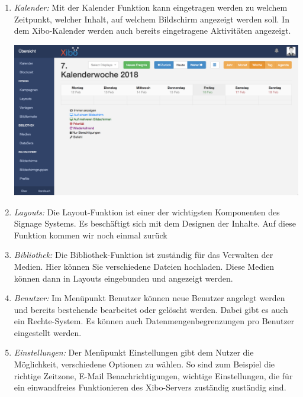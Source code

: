 \begin{enumerate}
	\item {\em Kalender:} Mit der Kalender Funktion kann eingetragen werden zu welchem Zeitpunkt, welcher Inhalt, auf welchem Bildschirm angezeigt werden soll. In dem Xibo-Kalender werden auch bereits eingetragene Aktivitäten angezeigt.

\begin{calendar}
	\centering
\includegraphics[width=1\textwidth]{images/xibo-basics-calendar}
	\label{Calendar}
\end{calendar}	
	
	\item {\em Layouts:} 
	Die Layout-Funktion ist einer der wichtigsten Komponenten des Signage Systems. Es beschäftigt sich mit dem Designen der Inhalte. Auf diese Funktion kommen wir noch einmal zurück
	
	\item {\em Bibliothek:} 
	Die Bibliothek-Funktion ist zuständig für das Verwalten der Medien. Hier können Sie verschiedene Dateien hochladen.  Diese Medien können dann in Layouts eingebunden und angezeigt werden.
	
	\item {\em Benutzer:} 
	Im Menüpunkt Benutzer können neue Benutzer angelegt werden und bereits bestehende bearbeitet oder gelöscht werden. Dabei gibt es auch ein Rechte-System. Es können auch Datenmengenbegrenzungen pro Benutzer eingestellt werden.
	
	\item {\em Einstellungen:} 
	Der Menüpunkt Einstellungen gibt dem Nutzer die Möglichkeit, verschiedene Optionen zu wählen. So sind zum Beispiel die richtige Zeitzone, E-Mail Benachrichtigungen, wichtige Einstellungen, die für ein einwandfreies Funktionieren des Xibo-Servers zuständig zuständig sind.
\end{enumerate}

